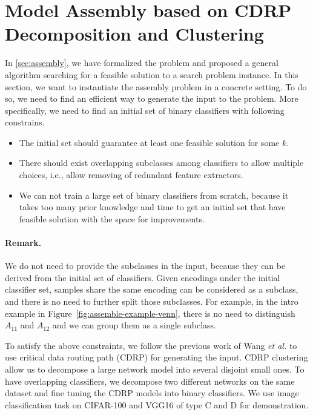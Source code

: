 \documentclass[sigplan,10pt,review]{acmart}\settopmatter{printfolios=true,printccs=false,printacmref=false}
\begin{document}
\section{Model Assembly based on CDRP Decomposition and Clustering}
\label{sec:cdrp}
In \cref{sec:assembly}, we have formalized the problem and proposed a general algorithm searching for a feasible solution to a search problem instance.
In this section, we want to instantiate the assembly problem in a concrete setting.
To do so, we need to find an efficient way to generate the input to the problem.
More specifically, we need to find an initial set of binary classifiers with following constrains.
\begin{itemize}
	\item The initial set should guarantee at least one feasible solution for some $k$.
	\item There should exist overlapping subclasses among classifiers to allow multiple choices, i.e., allow removing of redundant feature extractors.
	\item We can not train a large set of binary classifiers from scratch, because it takes too many prior knowledge and time to get an initial set that have feasible solution with the space for improvements.
\end{itemize}



\paragraph{Remark.} We do not need to provide the subclasses in the input, because they can be derived from the initial set of classifiers.
Given encodings under the initial classifier set, samples share the same encoding can be considered as a subclass, and there is no need to further split those subclasses.
For example, in the intro example in Figure~\ref{fig:assemble-example-venn}, there is no need to distinguish $A_{11}$ and $A_{12}$ and we can group them as a single subclass.

To satisfy the above constraints, we follow the previous work of Wang \textit{et al.} \cite{wang2018interpret} to use critical data routing path (CDRP) for generating the input.
CDRP clustering allow us to decompose a large network model into several disjoint small ones.
To have overlapping classifiers, we decompose two different networks on the same dataset and fine tuning the CDRP models into binary classifiers.
We use image classification task on CIFAR-100 and VGG16 of type C and D for demonstration.
\end{document}

